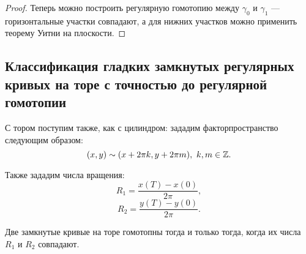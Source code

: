 \begin{proof}
    Теперь можно построить регулярную гомотопию между $\gamma_0$ и $\gamma_1$ — горизонтальные участки совпадают, а для нижних участков можно применить теорему Уитни на плоскости.

    
\end{proof} 

\subsection{Классификация гладких замкнутых регулярных кривых на торе с точностью до регулярной гомотопии}

С тором поступим также, как с цилиндром: зададим факторпространство следующим образом:
\[(x,y) \sim (x + 2\pi k, y + 2\pi m), \ k,m \in \mathbb{Z}.\]

Также зададим числа вращения:
\[R_1 = \frac{x(T) - x(0)}{2\pi},\]
\[R_2 = \frac{y(T) - y(0)}{2\pi}.\]

\begin{theorem}
    Две замкнутые кривые на торе гомотопны тогда и только тогда, когда их числа $R_1$ и $R_2$ совпадают.
\end{theorem} 

